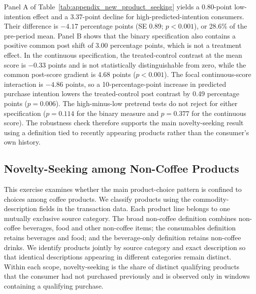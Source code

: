 \documentclass[11 pt]{article}
\newcommand\fnote[1]{\captionsetup{font=footnotesize}\caption*{#1}}
\begin{document}
\begin{table}[!ht]
\fnote{Notes: Column (1) uses the binary high-predicted-intention indicator; column (2) uses the mean-centered predicted-intention score. In Panel A, the low- and high-intention rows are directly estimated treated-control post contrasts, and the high-minus-low row is their DDD. These discrete group effects are not defined for column (2). In Panel B, Post $\times$ Predicted intention is the common post shift across treated and control consumers; it is not a treatment effect. Boldface marks the focal DDD coefficients. In column (2), a one-unit change corresponds to moving across the full predicted-intention scale. Standard errors, clustered by closure event (18 clusters), are in parentheses; p-values are in brackets. All regressions omit the closure window.}
\end{table}

Panel A of Table~\ref{tab:appendix_new_product_seeking} yields a 0.80-point low-intention effect and a 3.37-point decline for high-predicted-intention consumers. Their difference is $-4.17$ percentage points (SE 0.89; $p<0.001$), or 28.6\% of the pre-period mean. Panel B shows that the binary specification also contains a positive common post shift of 3.00 percentage points, which is not a treatment effect. In the continuous specification, the treated-control contrast at the mean score is $-0.33$ points and is not statistically distinguishable from zero, while the common post-score gradient is 4.68 points ($p<0.001$). The focal continuous-score interaction is $-4.86$ points, so a 10-percentage-point increase in predicted purchase intention lowers the treated-control post contrast by 0.49 percentage points ($p=0.006$). The high-minus-low pretrend tests do not reject for either specification ($p=0.114$ for the binary measure and $p=0.377$ for the continuous score). The robustness check therefore supports the main novelty-seeking result using a definition tied to recently appearing products rather than the consumer's own history.

\subsection{Novelty-Seeking among Non-Coffee Products}
\label{app:noncoffee_novelty}

This exercise examines whether the main product-choice pattern is confined to choices among coffee products. We classify products using the commodity-description fields in the transaction data. Each product line belongs to one mutually exclusive source category. The broad non-coffee definition combines non-coffee beverages, food and other non-coffee items; the consumables definition retains beverages and food; and the beverage-only definition retains non-coffee drinks. We identify products jointly by source category and exact description so that identical descriptions appearing in different categories remain distinct. Within each scope, novelty-seeking is the share of distinct qualifying products that the consumer had not purchased previously and is observed only in windows containing a qualifying purchase.
\end{document}
